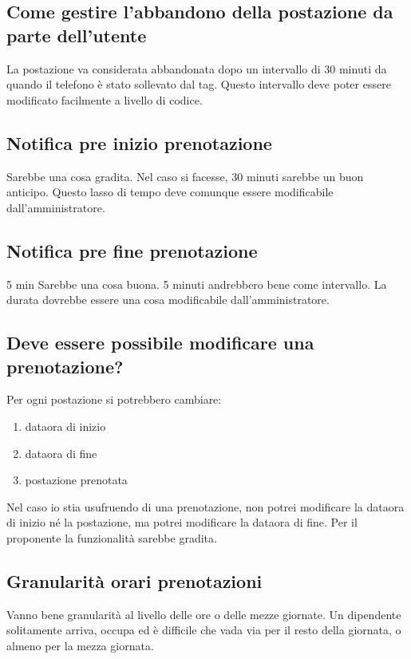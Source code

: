 \subsection*{Come gestire l'abbandono della postazione da parte dell'utente}
La postazione va considerata abbandonata dopo un intervallo di 30 minuti da quando il telefono è stato sollevato dal tag. Questo intervallo deve poter essere modificato facilmente a livello di codice.


\subsection*{Notifica pre inizio prenotazione}
Sarebbe una cosa gradita. Nel caso si facesse, 30 minuti sarebbe un buon anticipo. \newline
Questo lasso di tempo deve comunque essere modificabile dall'amministratore.

\subsection*{Notifica pre fine prenotazione}
5 min
Sarebbe una cosa buona. 5 minuti andrebbero bene come intervallo. La durata dovrebbe essere una cosa modificabile dall'amministratore.

\subsection*{Deve essere possibile modificare una prenotazione? }
Per ogni postazione si potrebbero cambiare:
\begin{enumerate}
	\item dataora di inizio
	\item dataora di fine	
	\item postazione prenotata
\end{enumerate}	
Nel caso io stia usufruendo di una prenotazione, non potrei modificare la dataora di inizio né la postazione, ma potrei modificare la dataora di fine.\newline
Per il proponente la funzionalità sarebbe gradita.

\subsection*{Granularità orari prenotazioni}
Vanno bene granularità al livello delle ore o delle mezze giornate.
Un dipendente solitamente arriva, occupa ed è difficile che vada via per il resto della giornata, o almeno per la mezza giornata.

